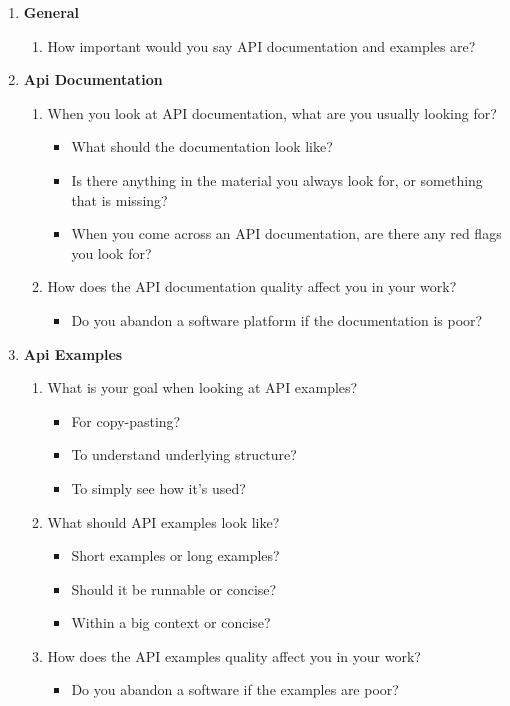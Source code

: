 \documentclass{article}
\begin{document}
\begin{enumerate}[label={A\Alph*}]
\item \textbf{General}
\begin{enumerate}[label={AA\arabic*}]
\item How important would you say API documentation and examples are?
\end{enumerate}
\item \textbf{Api Documentation}
\begin{enumerate}[label=AB\arabic*]
\item When you look at API documentation, what are you usually looking for?
\begin{itemize}[label={-}]
\item What should the documentation look like?
\item Is there anything in the material you always look for, or something that is missing?
\item When you come across an API documentation, are there any red flags you look for?
\end{itemize}
\item	How does the API documentation quality affect you in your work?
\begin{itemize}[label={-}]
\item Do you abandon a software platform if the documentation is poor?
\end{itemize}
\end{enumerate}
\item \textbf{Api Examples}
\begin{enumerate}[label={AC\arabic*}]
\item	What is your goal when looking at API examples?
\begin{itemize}[label={-}]
\item For copy-pasting?
\item To understand underlying structure?
\item To simply see how it's used?
\end{itemize}
\item   What should API examples look like?
\begin{itemize}[label={-}]
\item Short examples or long examples?
\item Should it be runnable or concise?
\item Within a big context or concise?
\end{itemize}
\item	How does the API examples quality affect you in your work?
\begin{itemize}[label={-}]
\item Do you abandon a software if the examples are poor?
\end{itemize}
\end{enumerate}


\end{enumerate}
\end{document}
